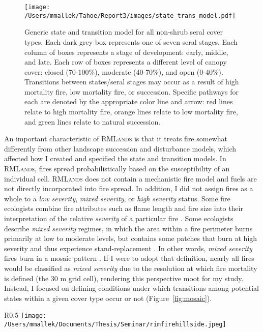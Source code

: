 \begin{figure}[htbp]
\centering
\texttt{[image: /Users/mmallek/Tahoe/Report3/images/state\_trans\_model.pdf]}
\caption{Generic state and transition model for all non-shrub seral cover types. Each dark grey box represents one of seven seral stages. Each column of boxes represents a stage of development: early, middle, and late. Each row of boxes represents a different level of canopy cover: closed (70-100\%), moderate (40-70\%), and open (0-40\%). Transitions between states/seral stages may occur as a result of high mortality fire, low mortality fire, or succession. Specific pathways for each are denoted by the appropriate color line and arrow: red lines relate to high mortality fire, orange lines relate to low mortality fire, and green lines relate to natural succession.} 
\label{transmodel}
\end{figure}


An important characteristic of \textsc{RMLands} is that it treats fire somewhat differently from other landscape succession and disturbance models, which affected how I created and specified the state and transition models. In \textsc{RMLands}, fires spread probabilistically based on the susceptibility of an individual cell. \textsc{RMLands} does not contain a mechanistic fire model and fuels are not directly incorporated into fire spread. In addition, I did not assign fires as a whole to a \emph{low severity}, \emph{mixed severity}, or \emph{high severity} status. Some fire ecologists combine fire attributes such as flame length and fire size into their interpretation of the relative \emph{severity} of a particular fire \citep{Agee1993}. Some ecologists describe \emph{mixed severity} regimes, in which the area within a fire perimeter burns primarily at low to moderate levels, but contains some patches that burn at high severity and thus experience stand-replacement \citep{Collins2010,Kane2013}. In other words, \emph{mixed severity} fires burn in a mosaic pattern \citep{Beaty2001}. If I were to adopt that definition, nearly all fires would be classified as \emph{mixed severity} due to the resolution at which fire mortality is defined (the 30 m grid cell), rendering this perspective moot for my study. Instead, I focused on defining conditions under which transitions among potential states within a given cover type occur or not (Figure~\ref{fig:mosaic}).

\begin{wrapfigure}{R}{0.5\textwidth} %
\texttt{[image: /Users/mmallek/Documents/Thesis/Seminar/rimfirehillside.jpeg]}
\caption{Aftermath of the 2013 Rim Fire in the Sierra Nevada \citep{rimfiremosaicphoto}. As in \textsc{RMLands}, post-fire, the landscape can be sorted into high mortality and low mortality areas.} 
\label{fig:mosaic}
\end{wrapfigure} 



